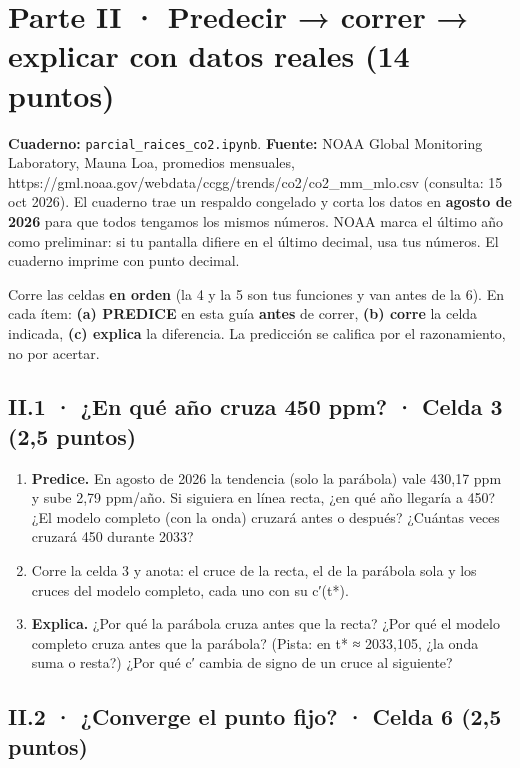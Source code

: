 \section{Parte II · Predecir → correr → explicar con datos reales (14 puntos)}

\textbf{Cuaderno:} \texttt{parcial\_raices\_co2.ipynb}. \textbf{Fuente:} NOAA Global Monitoring Laboratory, Mauna Loa, promedios mensuales, https://gml.noaa.gov/webdata/ccgg/trends/co2/co2\_mm\_mlo.csv (consulta: 15 oct 2026). El cuaderno trae un respaldo congelado y corta los datos en \textbf{agosto de 2026} para que todos tengamos los mismos números. NOAA marca el último año como preliminar: si tu pantalla difiere en el último decimal, usa tus números. El cuaderno imprime con punto decimal.

Corre las celdas \textbf{en orden} (la 4 y la 5 son tus funciones y van antes de la 6). En cada ítem: \textbf{(a) PREDICE} en esta guía \textbf{antes} de correr, \textbf{(b) corre} la celda indicada, \textbf{(c) explica} la diferencia. La predicción se califica por el razonamiento, no por acertar.

\subsection{II.1 · ¿En qué año cruza 450 ppm? · Celda 3 (2,5 puntos)}

\begin{enumerate}
\def\labelenumi{(\alph{enumi})}
\item
  \textbf{Predice.} En agosto de 2026 la tendencia (solo la parábola) vale 430,17 ppm y sube 2,79 ppm/año. Si siguiera en línea recta, ¿en qué año llegaría a 450? ¿El modelo completo (con la onda) cruzará antes o después? ¿Cuántas veces cruzará 450 durante 2033?
\item
  Corre la celda 3 y anota: el cruce de la recta, el de la parábola sola y los cruces del modelo completo, cada uno con su c′(t*).
\item
  \textbf{Explica.} ¿Por qué la parábola cruza antes que la recta? ¿Por qué el modelo completo cruza antes que la parábola? (Pista: en t* ≈ 2033,105, ¿la onda suma o resta?) ¿Por qué c′ cambia de signo de un cruce al siguiente?
\end{enumerate}

\subsection{II.2 · ¿Converge el punto fijo? · Celda 6 (2,5 puntos)}

